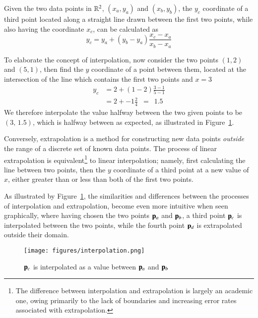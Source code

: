 Given the two data points in $\bR{2}$, $(x_a, y_a)$ and $(x_b, y_b)$, the $y_c$ coordinate of a third point located along a straight line drawn between the first two points, while also having the coordinate $x_c$, can be calculated as
%
\begin{equation}
	y_c = y_a + (y_b - y_a) \frac{x_c - x_a}{x_b - x_a}
	\label{eq:interpolationGeneral}
\end{equation}

To elaborate the concept of interpolation, now consider the two points $(1, 2)$ and $(5, 1)$, then find the $y$ coordinate of a point between them, located at the intersection of the line which contains the first two points and $x = 3$
%
\begin{align}
	y_c & = 2 + (1 - 2) \frac{3 - 1}{5 - 1} \\
	& = 2 + -1 \frac{2}{4} \enspace = \enspace  1.5
	\label{eq:interpolationSpecific}
\end{align}
%
We therefore interpolate the value halfway between the two given points to be $(3,\,1.5)$, which is halfway between as expected, as illustrated in Figure~\ref{fig:interpolation}.

Conversely, extrapolation is a method for constructing new data points \textit{outside} the range of a discrete set of known data points. The process of linear extrapolation is equivalent\footnote{The difference between interpolation and extrapolation is largely an academic one, owing primarily to the lack of boundaries and increasing error rates associated with extrapolation.} to linear interpolation; namely, first calculating the line between two points, then the $y$ coordinate of a third point at a new value of $x$, either greater than or less than both of the first two points. 

As illustrated by Figure~\ref{fig:interpolation}, the similarities and differences between the processes of interpolation and extrapolation, become even more intuitive when seen graphically, where having chosen the two points $\mathbf{p}_a$ and $\mathbf{p}_b$, a third point $\mathbf{p}_c$ is interpolated between the two points, while the fourth point $\mathbf{p}_d$ is extrapolated outside their domain.

\begin{figure}[ht]
\ffigbox
	{\texttt{[image: figures/interpolation.png]}}
	{\caption[Interpolation between two points in $\bR{2}$]{$\mathbf{p}_c$ is interpolated as a value between $\mathbf{p}_a$ and $\mathbf{p}_b$}\label{fig:interpolation}}
\end{figure}

